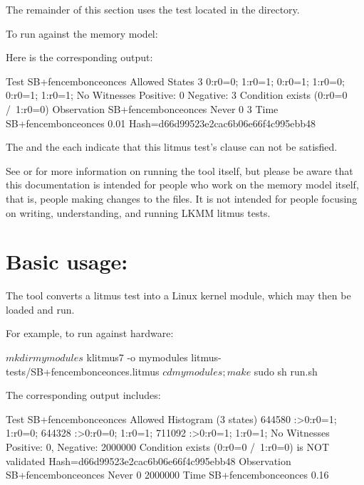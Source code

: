 The remainder of this section uses the 
test located in the  directory.

To run  against the memory model:


Here is the corresponding output:

\begin{VerbatimU}
  Test SB+fencembonceonces Allowed
  States 3
  0:r0=0; 1:r0=1;
  0:r0=1; 1:r0=0;
  0:r0=1; 1:r0=1;
  No
  Witnesses
  Positive: 0 Negative: 3
  Condition exists (0:r0=0 /\ 1:r0=0)
  Observation SB+fencembonceonces Never 0 3
  Time SB+fencembonceonces 0.01
  Hash=d66d99523e2cac6b06e66f4c995ebb48
\end{VerbatimU}

The  and the  each indicate that
this litmus test's  clause can not be satisfied.

See  or  for more information on
running the tool itself, but please be aware that this documentation is
intended for people who work on the memory model itself, that is, people
making changes to the  files.
It is not intended for people focusing on writing, understanding, and
running LKMM litmus tests.

\section{Basic usage: }

The  tool converts a litmus test into a Linux kernel module,
which may then be loaded and run.

For example, to run  against hardware:

\begin{VerbatimU}
  $ mkdir mymodules
  $ klitmus7 -o mymodules litmus-tests/SB+fencembonceonces.litmus
  $ cd mymodules ; make
  $ sudo sh run.sh
\end{VerbatimU}

The corresponding output includes:

\begin{VerbatimU}
  Test SB+fencembonceonces Allowed
  Histogram (3 states)
  644580  :>0:r0=1; 1:r0=0;
  644328  :>0:r0=0; 1:r0=1;
  711092  :>0:r0=1; 1:r0=1;
  No
  Witnesses
  Positive: 0, Negative: 2000000
  Condition exists (0:r0=0 /\ 1:r0=0) is NOT validated
  Hash=d66d99523e2cac6b06e66f4c995ebb48
  Observation SB+fencembonceonces Never 0 2000000
  Time SB+fencembonceonces 0.16
\end{VerbatimU}


